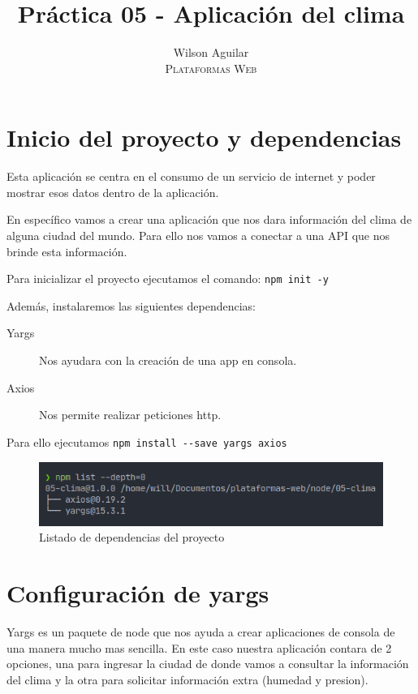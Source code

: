 \documentclass[12pt]{article}
\title{Práctica 05 - Aplicación del clima}
\author{ 
    Wilson Aguilar \\
    \textsc{Plataformas Web} 
}
\begin{document}
\maketitle

\section{Inicio del proyecto y dependencias}

Esta aplicación se centra en el consumo de un servicio de internet y poder mostrar esos datos dentro de la aplicación.

En específico vamos a crear una aplicación que nos dara información del clima de alguna ciudad del mundo. Para ello nos vamos a conectar a una API que nos brinde esta información.

Para inicializar el proyecto ejecutamos el comando:
\lstinline{npm init -y}

Además, instalaremos las siguientes dependencias:

\begin{description}
    \item[Yargs] Nos ayudara con la creación de una app en consola.
    \item [Axios] Nos permite realizar peticiones http.
\end{description}

Para ello ejecutamos \lstinline{npm install --save yargs axios}

\begin{figure}[H]
    \centering
    \includegraphics[scale=.8]{assets/images/dependences.png}
    \caption{Listado de dependencias del proyecto}
    \label{}
\end{figure}

\section{Configuración de yargs}

Yargs es un paquete de node que nos ayuda a crear aplicaciones de consola de una manera mucho mas sencilla. En este caso nuestra aplicación contara de 2 opciones, una para ingresar la ciudad de donde vamos a consultar la información del clima y la otra para solicitar información extra (humedad y presion).
\end{document}
